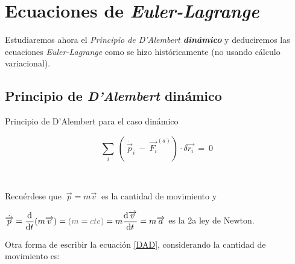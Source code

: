 \chapter{Ecuaciones de \emph{Euler-Lagrange}}
\label{CapEEL}


\vspace{1cm}


\begin{adjustwidth}{50pt}{50pt}
\begin{ejemplo}
	Estudiaremos ahora el \emph{Principio de D'Alembert \textbf{dinámico}} y  deduciremos las ecuaciones \emph{Euler-Lagrange} como se hizo históricamente (no usando cálculo variacional).	
\end{ejemplo}
\end{adjustwidth}
	
\vspace{0.5cm}

\section{Principio de \emph{D'Alembert} dinámico}

\vspace{0.5cm}

\begin{myblock}{Principio de D'Alembert para el caso dinámico}
$\,$

\begin{Large}
\begin{equation}
\label{DAD}
 \displaystyle \sum_i \ \left( \dot{ \ \overrightarrow p_i}\ - \ \overrightarrow{F_i}^{(a)} \right ) \cdot \delta \overrightarrow{r_i}	 \ = \ 0
\end{equation}
\end{Large}
$\,$
\end{myblock}

Recuérdese que $\ \displaystyle \overrightarrow p =m\overrightarrow v\ $ es la cantidad de movimiento y  

$\displaystyle  \dot{\overrightarrow p}=\dv{t} (m\overrightarrow v) = \textcolor{gris}{(m=cte)} = m\dv{\overrightarrow v}{t}=m \overrightarrow a$ es la 2a ley de Newton.

Otra forma de escribir la ecuación \ref{DAD}, considerando la cantidad de movimiento es:

